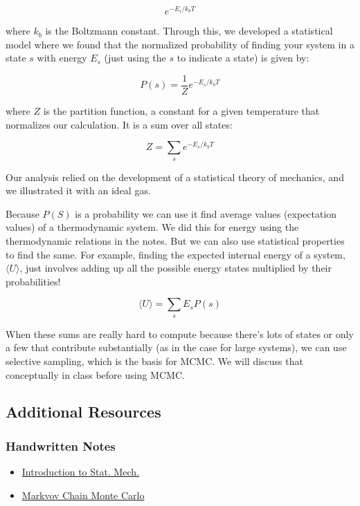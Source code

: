 \[e^{-E_i/{k_b T}}\]

where \(k_b\) is the Boltzmann constant. Through this, we developed a
statistical model where we found that the normalized probability of
finding your system in a state \(s\) with energy \(E_s\) (just using the
\(s\) to indicate a state) is given by:

\[P(s) = \dfrac{1}{Z} e^{-E_s/{k_b T}}\]

where \(Z\) is the partition function, a constant for a given
temperature that normalizes our calculation. It is a sum over all
states:

\[Z = \sum_s e^{-E_s/{k_b T}}\]

Our analysis relied on the development of a statistical theory of
mechanics, and we illustrated it with an ideal gas.

Because \(P(S)\) is a probability we can use it find average values
(expectation values) of a thermodynamic system. We did this for energy
using the thermodynamic relations in the notes. But we can also use
statistical properties to find the same. For example, finding the
expected internal energy of a system, \(\langle U \rangle\), just
involves adding up all the possible energy states multiplied by their
probabilities!

\[\langle U \rangle = \sum_s E_s P(s)\]

When these sums are really hard to compute because there's lots of
states or only a few that contribute substantially (as in the case for
large systems), we can use selective sampling, which is the basis for
MCMC. We will discuss that conceptually in class before using MCMC.

\subsection{Additional Resources}\label{additional-resources}

\subsubsection{Handwritten Notes}\label{handwritten-notes}

\begin{itemize}
\tightlist
\item
  \href{../assets/notes/Notes-Intro_to_Stat_Mech.pdf}{Introduction to
  Stat. Mech.}
\item
  \href{../assets/notes/Notes-Markov_Chain.pdf}{Markvov Chain Monte
  Carlo}
\end{itemize}

